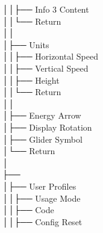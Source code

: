 │\hspace{2em}│\hspace{2em}├── Info 3 Content \\
│\hspace{2em}│\hspace{2em}└── Return \\
│\hspace{2em}│\hspace{2em} \\
│\hspace{2em}├── Units \\
│\hspace{2em}│\hspace{2em}├── Horizontal Speed \\
│\hspace{2em}│\hspace{2em}├── Vertical Speed \\
│\hspace{2em}│\hspace{2em}├── Height \\
│\hspace{2em}│\hspace{2em}└── Return \\
│\hspace{2em}│\hspace{2em} \\
│\hspace{2em}├── Energy Arrow \\
│\hspace{2em}├── Display Rotation \\
│\hspace{2em}├── Glider Symbol \\
│\hspace{2em}└── Return \\
│\hspace{2em} \\
├──  \\
│\hspace{2em}├── User Profiles \\
│\hspace{2em}│\hspace{2em}├── Usage Mode \\
│\hspace{2em}│\hspace{2em}├── Code \\
│\hspace{2em}│\hspace{2em}├── Config Reset \\
